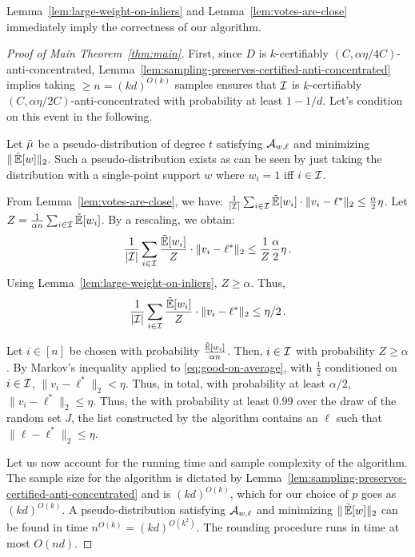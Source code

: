 Lemma~\ref{lem:large-weight-on-inliers} and Lemma~\ref{lem:votes-are-close} immediately imply the correctness of our algorithm. 
\begin{proof}[Proof of Main Theorem~\ref{thm:main}]
First, since $D$ is $k$-certifiably $(C,\alpha \eta/4C)$-anti-concentrated, Lemma~\ref{lem:sampling-preserves-certified-anti-concentrated} implies taking $\geq n = (kd)^{O(k)}$ samples ensures that $\mathcal I$ is $k$-certifiably $(C,\alpha \eta/2C)$-anti-concentrated with probability at least $1-1/d$. Let's condition on this event in the following. 

Let $\tilde{\mu}$ be a pseudo-distribution of degree $t$ satisfying $\mathcal A_{w,\ell}$ and minimizing $\|\operatorname{\tilde{\mathbb{E}}}[w]\|_2$.
Such a pseudo-distribution exists as can be seen by just taking the distribution with a single-point support $w$ where $w_i = 1$ iff $i \in \mathcal I$. 

From Lemma~\ref{lem:votes-are-close}, we have: 
$
\frac{1}{|\mathcal I|} \sum_{i \in \mathcal I} \operatorname{\tilde{\mathbb{E}}}[w_i] \cdot \|v_i -\ell^*\|_2 \leq \frac{\alpha}{2} \eta 
$. Let $Z = \frac{1}{\alpha n} \sum_{i \in \mathcal I} \operatorname{\tilde{\mathbb{E}}}[w_i]$. By a rescaling, we obtain:
\begin{equation} 
\frac{1}{|\mathcal I|} \sum_{i \in \mathcal I} \frac{\operatorname{\tilde{\mathbb{E}}}[w_i]}{Z} \cdot \|v_i -\ell^*\|_2 \leq \frac{1}{Z} \frac{\alpha}{2} \eta\,.
\end{equation}
Using Lemma~\ref{lem:large-weight-on-inliers}, $Z \geq \alpha$. Thus, 
\begin{equation} 
\label{eq:good-on-average}
\frac{1}{|\cI|} \sum_{i \in \cI} \frac{\pE[w_i]}{Z} \cdot \|v_i -\ell^*\|_2 \leq \eta/2 \mper
\end{equation}

Let $i \in [n]$ be chosen with probability $\frac{\operatorname{\tilde{\mathbb{E}}}[w_i]}{\alpha n}$. 
Then, $i \in \mathcal I$ with probability $Z \geq \alpha$. 
By Markov's inequality applied to \eqref{eq:good-on-average}, with $\frac{1}{2}$ conditioned on $i \in \mathcal I$, $\|v_i - \ell^*\|_2 < \eta$. Thus, in total, with probability at least $\alpha/2$, $\|v_i - \ell^*\|_2 \leq \eta$.
Thus, the with probability at least $0.99$ over the draw of the random set $J$, the list constructed by the algorithm contains an $\ell$ such that $\|\ell - \ell^*\|_2 \leq \eta$.

Let us now account for the running time and sample complexity of the algorithm.
The sample size for the algorithm is dictated by Lemma~\ref{lem:sampling-preserves-certified-anti-concentrated} and is $(kd)^{O(k)}$, which for our choice of $p$ goes as $(kd)^{O(k)}$.
A pseudo-distribution satisfying $\mathcal A_{w,\ell}$ and minimizing $\|\operatorname{\tilde{\mathbb{E}}}[w]\|_2$ can be found in time $n^{O(k)} = (kd)^{O(k^2)}$. 
The rounding procedure runs in time at most $O(nd)$. 
\end{proof}
